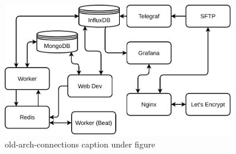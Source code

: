 \begin{figure}[!htbp]
    \centering
    \includegraphics[width=0.90\textwidth]{img/diagrams/pdf/old-arch-connections.drawio.pdf}
    \caption[old-arch-connections listing]{old-arch-connections caption under figure}
    \label{fig:old-arch-connections}
\end{figure}

